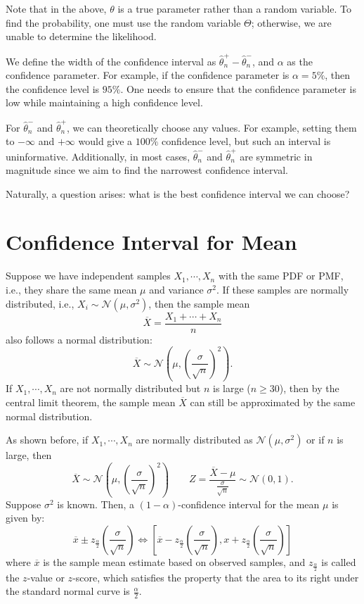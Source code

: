 \begin{remark}
  Note that in the above, \(\theta\) is a true parameter rather than a random variable. To find the probability, one must use the random variable \(\Theta\); otherwise, we are unable to determine the likelihood.
\end{remark}

We define the width of the confidence interval as \(\hat{\theta}_n^+ - \hat{\theta}_n^-\), and \(\alpha\) as the confidence parameter. For example, if the confidence parameter is \(\alpha = 5\%\), then the confidence level is \(95\%\). One needs to ensure that the confidence parameter is low while maintaining a high confidence level.

For \(\hat{\theta}_n^-\) and \(\hat{\theta}_n^+\), we can theoretically choose any values. For example, setting them to \(-\infty\) and \(+\infty\) would give a \(100\%\) confidence level, but such an interval is uninformative. Additionally, in most cases, \(\hat{\theta}_n^-\) and \(\hat{\theta}_n^+\) are symmetric in magnitude since we aim to find the narrowest confidence interval.

Naturally, a question arises: what is the best confidence interval we can choose?

\section{Confidence Interval for Mean}
Suppose we have independent samples \(X_1, \cdots, X_n\) with the same PDF or PMF, i.e., they share the same mean \(\mu\) and variance \(\sigma^2\). If these samples are normally distributed, i.e., \(X_i \sim \mathcal{N}(\mu, \sigma^2)\), then the sample mean 
\[
\overline{X} = \frac{X_1 + \cdots + X_n}{n}
\]
also follows a normal distribution:
\[
\overline{X} \sim \mathcal{N}\left(\mu, \left(\frac{\sigma}{\sqrt{n}}\right)^2\right).
\]
If \(X_1, \cdots, X_n\) are not normally distributed but \(n\) is large (\(n \geq 30\)), then by the central limit theorem, the sample mean \(\overline{X}\) can still be approximated by the same normal distribution. 

As shown before, if \(X_1, \cdots, X_n\) are normally distributed as \(\mathcal{N}(\mu, \sigma^2)\) or if \(n\) is large, then
\[
  \overline{X} \sim \mathcal{N}\left(\mu, \left(\frac{\sigma}{\sqrt{n}}\right)^2\right) \quad\quad Z = \dfrac{\overline{X} - \mu}{\frac{\sigma}{\sqrt{n}}} \sim \mathcal{N}(0, 1). 
\]
Suppose \(\sigma^2\) is known. Then, a \((1 - \alpha)\)-confidence interval for the mean \(\mu\) is given by:
\[
  \overline{x} \pm z_{\frac{\alpha}{2}}\left(\frac{\sigma}{\sqrt{n}}\right) \Longleftrightarrow \left[\overline{x} - z_{\frac{\alpha}{2}}\left(\frac{\sigma}{\sqrt{n}}\right), x + z_{\frac{\alpha}{2}}\left(\frac{\sigma}{\sqrt{n}}\right)\right]
\]
where \(\overline{x}\) is the sample mean estimate based on observed samples, and \(z_{\frac{\alpha}{2}}\) is called the \(z\)-value or \(z\)-score, which satisfies the property that the area to its right under the standard normal curve is \(\frac{\alpha}{2}\).

